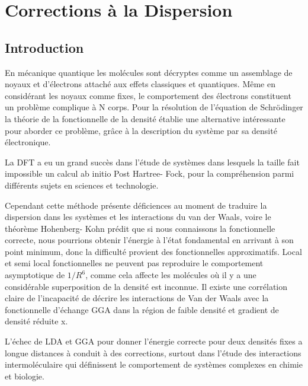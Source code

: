 \chapter[Corrections à la dispersion]{Corrections à la Dispersion}
\minitoc
\restoregeometry

\newpage

	\section*{Introduction}
	
	En mécanique quantique les molécules sont décryptes comme un assemblage de noyaux et d'électrons attaché aux effets classiques et quantiques. Même en considérant les noyaux comme fixes, le comportement des électrons constituent un problème complique à N corps. Pour la résolution de l'équation de Schrödinger la théorie de la fonctionnelle de la densité établie une alternative intéressante pour aborder ce problème, grâce à la description du système par sa densité électronique\cite{adamo2014decrire}.
	
	\bigskip
	La DFT a eu un grand succès dans l'étude de systèmes dans lesquels la taille fait impossible un calcul ab initio Post Hartree- Fock, pour la compréhension parmi différents sujets en sciences et technologie.\cite{neese2009prediction,sanchez1997density,waller2006hybrid}
	\bigskip
	
	Cependant cette méthode présente déficiences au moment de traduire la dispersion dans les systèmes et les interactions du van der Waals, voire le théorème Hohenberg- Kohn prédit que si nous connaissons la fonctionnelle correcte, nous pourrions obtenir l’énergie à l’état fondamental en arrivant à son point minimum, donc la difficulté provient des fonctionnelles approximatifs. Local et semi local fonctionnelles  ne peuvent pas reproduire le comportement asymptotique de $1/R^{6}$, comme cela affecte les molécules où il y a une considérable superposition de la densité est inconnue. Il existe une corrélation claire de l'incapacité de décrire les interactions de Van der Waals avec la fonctionnelle d'échange GGA dans la région de faible densité et gradient de densité réduite x. 
	
	
	L'échec de LDA et GGA pour donner l'énergie correcte pour deux densités fixes a longue distances à conduit à des corrections, surtout dans l'étude des interactions intermoléculaire qui définissent le comportement de systèmes complexes en chimie et biologie. 
	

